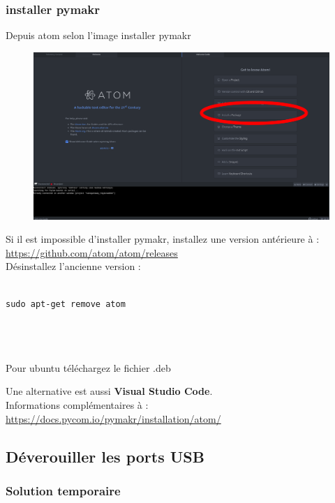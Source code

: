 \documentclass{article}
\begin{document}
\subsubsection{installer pymakr}


Depuis atom selon l'image installer pymakr


    \begin{figure}[H]
\begin{center}
\advance\leftskip-3cm
\advance\rightskip-3cm
\includegraphics[keepaspectratio=true,scale=0.2]{atom_installpymakr.png}
\label{visina8}
\end{center}\end{figure}

Si il est impossible d'installer pymakr, installez une version antérieure à : \url{https://github.com/atom/atom/releases}\\
Désinstallez l'ancienne version :
\begin{verbatim}

sudo apt-get remove atom




\end{verbatim}

Pour ubuntu téléchargez le fichier .deb

Une alternative est aussi \textbf{Visual Studio Code}. \\

Informations complémentaires à  : \url{https://docs.pycom.io/pymakr/installation/atom/}

\subsection{Déverouiller les ports USB}
\subsubsection{Solution temporaire} 
\end{document}
